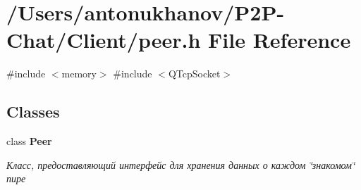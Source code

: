 \section{/\+Users/antonukhanov/\+P2\+P-\/\+Chat/\+Client/peer.h File Reference}
\label{peer_8h}
{\ttfamily \#include $<$memory$>$}\newline
{\ttfamily \#include $<$Q\+Tcp\+Socket$>$}\newline
\subsection*{Classes}
\begin{DoxyCompactItemize}
\item 
class \textbf{ Peer}
\begin{DoxyCompactList}\small\item\em Класс, предоставляющий интерфейс для хранения данных о каждом \char`\"{}знакомом\char`\"{} пире \end{DoxyCompactList}\end{DoxyCompactItemize}
